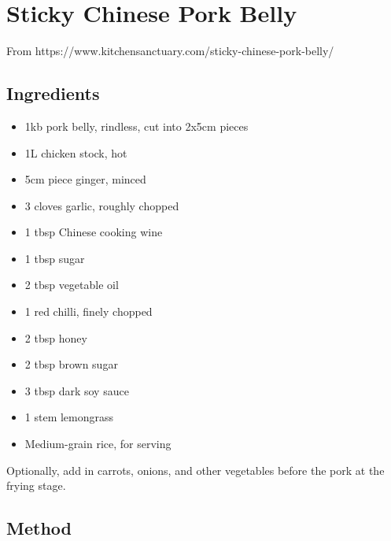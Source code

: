 \clearpage
\section{Sticky Chinese Pork Belly}


From https://www.kitchensanctuary.com/sticky-chinese-pork-belly/

\subsection{Ingredients}

\begin{itemize}
	\item 1kb pork belly, rindless, cut into 2x5cm pieces
	\item 1L chicken stock, hot
	\item 5cm piece ginger, minced
	\item 3 cloves garlic, roughly chopped
	\item 1 tbsp Chinese cooking wine
	\item 1 tbsp sugar
	\item 2 tbsp vegetable oil
	\item 1 red chilli, finely chopped
	\item 2 tbsp honey
	\item 2 tbsp brown sugar
	\item 3 tbsp dark soy sauce
	\item 1 stem lemongrass
	\item Medium-grain rice, for serving
\end{itemize}

Optionally, add in carrots, onions, and other vegetables before the pork at the frying stage.

\subsection{Method}

